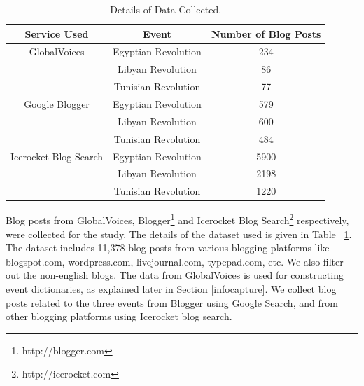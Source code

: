 \begin{table}[htbp]
\centering
\caption{Details of Data Collected.}
\label{tab:table1}
\begin{tabular}{|c|c|c| }
\hline
\textbf{Service Used} & \textbf{Event} & \textbf{Number of Blog Posts} \\ [0.5ex]
\hline
GlobalVoices & Egyptian Revolution & 234 \\
&Libyan Revolution & 86 \\
&Tunisian Revolution & 77\\
\hline 
Google Blogger & Egyptian Revolution & 579 \\
&Libyan Revolution & 600 \\
&Tunisian Revolution & 484 \\
\hline
Icerocket Blog Search & Egyptian Revolution & 5900 \\ 
&Libyan Revolution & 2198 \\
&Tunisian Revolution & 1220 \\
\hline
\end{tabular}
\end{table}


%
Blog posts from GlobalVoices, Blogger\footnote{http://blogger.com} and Icerocket Blog Search\footnote{http://icerocket.com} respectively, were collected for the study. The details of the dataset used is given in Table ~\ref{tab:table1}. The dataset includes 11,378 blog posts from various blogging platforms like blogspot.com, wordpress.com, livejournal.com, typepad.com, etc. We also filter out the non-english blogs. The data from GlobalVoices is used for constructing event dictionaries, as explained later in Section \ref{infocapture}. We collect blog posts related to the three events from Blogger using Google Search, and from other blogging platforms using Icerocket blog search. 



